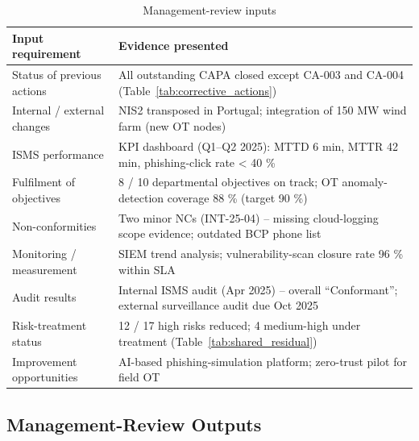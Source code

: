 \begin{table}[htbp]
  \centering
  \caption{Management-review inputs}
  \label{tab:review_inputs}
  \begin{tabular}{|p{5.2cm}|p{7.8cm}|}
    \hline
    \textbf{Input requirement} & \textbf{Evidence presented}\\ \hline
    Status of previous actions & All outstanding CAPA closed except CA-003 and CA-004 (Table~\ref{tab:corrective_actions})\\ \hline
    Internal / external changes & \ac{NIS2} transposed in Portugal; integration of 150 MW wind farm (new OT nodes)\\ \hline
    \ac{ISMS} performance & KPI dashboard (Q1–Q2 2025): MTTD 6 min, MTTR 42 min, phishing-click rate < 40 \%\\ \hline
    Fulfilment of objectives & 8 / 10 departmental objectives on track; OT anomaly-detection coverage 88 \% (target 90 \%)\\ \hline
    Non-conformities & Two minor NCs (INT-25-04) – missing cloud-logging scope evidence; outdated BCP phone list\\ \hline
    Monitoring / measurement & SIEM trend analysis; vulnerability-scan closure rate 96 \% within SLA\\ \hline
    Audit results & Internal \ac{ISMS} audit (Apr 2025) – overall “Conformant”; external surveillance audit due Oct 2025\\ \hline
    Risk-treatment status & 12 / 17 high risks reduced; 4 medium-high under treatment (Table~\ref{tab:shared_residual})\\ \hline
    Improvement opportunities & AI-based phishing-simulation platform; zero-trust pilot for field OT\\ \hline
  \end{tabular}
\end{table}

\subsection{Management-Review Outputs}

